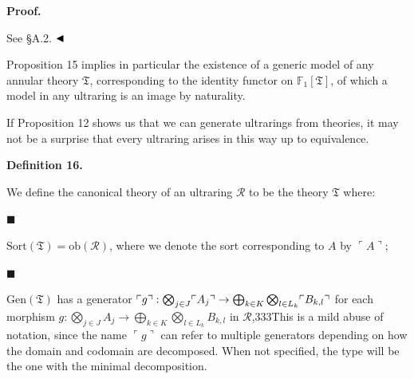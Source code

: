  
 
\par\medskip\noindent\textbf{Proof.}\par
 
 
See §A.2. $\hfill\blacktriangleleft$\par
 
 
 
Proposition 15 implies in particular the existence of a generic model of any annular theory $\mathfrak{T}$, corresponding to the identity functor on $\mathbb{F}_{1}[\mathfrak{T}]$, of which a model in any ultraring is an image by naturality.\par
 
 
 
If Proposition 12 shows us that we can generate ultrarings from theories, it may not be a surprise that every ultraring arises in this way up to equivalence.\par
 
 
 
\par\medskip\noindent\textbf{Definition 16.}\par
 
 
We define the canonical theory of an ultraring $\mathcal{R}$ to be the theory $\mathfrak{T}$ where:\par
  
\par\noindent  $\blacksquare$ 
 
$\mathrm{Sort}(\mathfrak{T})=\mathrm{ob}(\mathcal{R})$, where we denote the sort corresponding to $A$ by $\ulcorner A\urcorner$;\par
 
 
 
\par\noindent  $\blacksquare$ 
 
$\mathrm{Gen}(\mathfrak{T})$ has a generator $\ulcorner g\urcorner:\bigotimes_{j\in J}\ulcorner A_{j}\urcorner\to\bigoplus_{%
k\in K}\bigotimes_{l\in L_{k}}\ulcorner B_{k,l}\urcorner$ for each morphism $g:\bigotimes_{j\in J}A_{j}\to\bigoplus_{k\in K}\bigotimes_{l\in L_{k}}B_{k,l}$ in $\mathcal{R}$,333This is a mild abuse of notation, since the name $\ulcorner g\urcorner$ can refer to multiple generators depending on how the domain and codomain are decomposed. When not specified, the type will be the one with the minimal decomposition.\par
 
